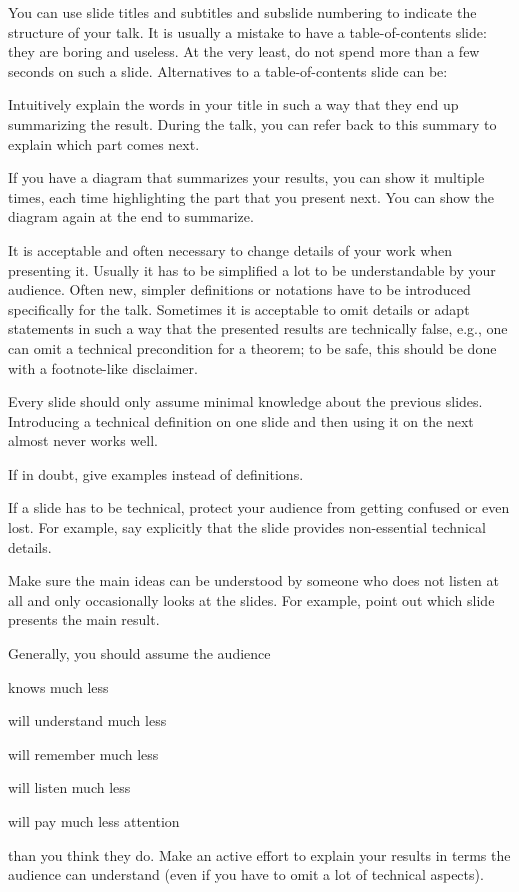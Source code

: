 \documentclass[12pt]{article}
\begin{document}
You can use slide titles and subtitles and subslide numbering to indicate the structure of your talk.
It is usually a mistake to have a table-of-contents slide: they are boring and useless.
At the very least, do not spend more than a few seconds on such a slide.
Alternatives to a table-of-contents slide can be:
\begin{compactitem}
\item Intuitively explain the words in your title in such a way that they end up summarizing the result.
During the talk, you can refer back to this summary to explain which part comes next.
\item If you have a diagram that summarizes your results, you can show it multiple times, each time highlighting the part that you present next.
You can show the diagram again at the end to summarize.
\end{compactitem}
\medskip

It is acceptable and often necessary to change details of your work when presenting it.
Usually it has to be simplified a lot to be understandable by your audience.
Often new, simpler definitions or notations have to be introduced specifically for the talk.
Sometimes it is acceptable to omit details or adapt statements in such a way that the presented results are technically false, e.g., one can omit a technical precondition for a theorem; to be safe, this should be done with a footnote-like disclaimer.
\medskip

Every slide should only assume minimal knowledge about the previous slides.
Introducing a technical definition on one slide and then using it on the next almost never works well.
\medskip

If in doubt, give examples instead of definitions.
\medskip

If a slide has to be technical, protect your audience from getting confused or even lost.
For example, say explicitly that the slide provides non-essential technical details.
\medskip

Make sure the main ideas can be understood by someone who does not listen at all and only occasionally looks at the slides.
For example, point out which slide presents the main result.
\medskip

Generally, you should assume the audience
\begin{compactitem}
\item knows much less
\item will understand much less
\item will remember much less
\item will listen much less
\item will pay much less attention
\end{compactitem}
than you think they do.
Make an active effort to explain your results in terms the audience can understand (even if you have to omit a lot of technical aspects).
\medskip
\end{document}
